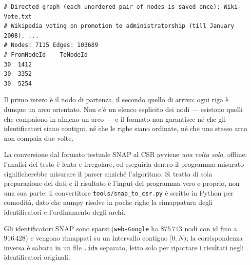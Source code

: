 \documentclass[11pt,a4paper]{article}
\newcommand{\stacco}{\par\medskip\noindent}
\begin{document}
\begin{lstlisting}[numbers=none]
# Directed graph (each unordered pair of nodes is saved once): Wiki-Vote.txt
# Wikipedia voting on promotion to administratorship (till January 2008). ...
# Nodes: 7115 Edges: 103689
# FromNodeId	ToNodeId
30	1412
30	3352
30	5254
\end{lstlisting}

Il primo intero è il nodo di partenza, il secondo quello di arrivo: ogni riga
è dunque un arco orientato. Non c'è un elenco esplicito dei nodi --- esistono
quelli che compaiono in almeno un arco --- e il formato non garantisce né che
gli identificatori siano contigui, né che le righe siano ordinate, né che uno
stesso arco non compaia due volte.

\stacco
La conversione dal formato testuale SNAP al CSR avviene \emph{una volta
sola}, offline: l'analisi del testo è lenta e irregolare, ed eseguirla dentro
il programma misurato significherebbe misurare il parser anziché l'algoritmo.
Si tratta di sola preparazione dei dati e il risultato è l'input del
programma vero e proprio, non una sua parte: il convertitore
\texttt{tools/snap\_to\_csr.py} è scritto in Python per comodità, dato che
numpy risolve in poche righe la rimappatura degli identificatori e
l'ordinamento degli archi.

\stacco
Gli identificatori SNAP sono sparsi (\texttt{web-Google} ha $875\,713$ nodi
con id fino a $916\,428$) e vengono rimappati su un intervallo contiguo
$[0,N)$; la corrispondenza inversa è salvata in un file \texttt{.ids}
separato, letto solo per riportare i risultati negli identificatori
originali.
\end{document}

